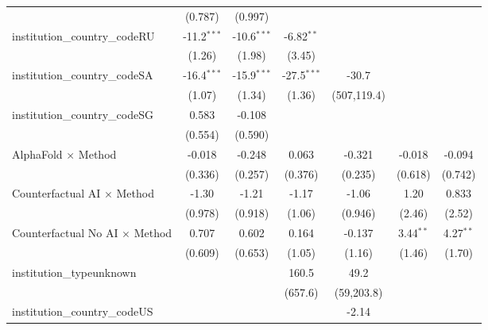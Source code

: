 \begin{tabular}{lcccccc}
                                         & (0.787)       & (0.997)       &               &              &               &   \\   
   institution\_country\_codeRU          & -11.2$^{***}$ & -10.6$^{***}$ & -6.82$^{**}$  &              &               &   \\   
                                         & (1.26)        & (1.98)        & (3.45)        &              &               &   \\   
   institution\_country\_codeSA          & -16.4$^{***}$ & -15.9$^{***}$ & -27.5$^{***}$ & -30.7        &               &   \\   
                                         & (1.07)        & (1.34)        & (1.36)        & (507,119.4)  &               &   \\   
   institution\_country\_codeSG          & 0.583         & -0.108        &               &              &               &   \\   
                                         & (0.554)       & (0.590)       &               &              &               &   \\   
   AlphaFold $\times$ Method             & -0.018        & -0.248        & 0.063         & -0.321       & -0.018        & -0.094\\   
                                         & (0.336)       & (0.257)       & (0.376)       & (0.235)      & (0.618)       & (0.742)\\   
   Counterfactual AI $\times$ Method     & -1.30         & -1.21         & -1.17         & -1.06        & 1.20          & 0.833\\   
                                         & (0.978)       & (0.918)       & (1.06)        & (0.946)      & (2.46)        & (2.52)\\   
   Counterfactual No AI $\times$ Method  & 0.707         & 0.602         & 0.164         & -0.137       & 3.44$^{**}$   & 4.27$^{**}$\\   
                                         & (0.609)       & (0.653)       & (1.05)        & (1.16)       & (1.46)        & (1.70)\\   
   institution\_typeunknown              &               &               & 160.5         & 49.2         &               &   \\   
                                         &               &               & (657.6)       & (59,203.8)   &               &   \\   
   institution\_country\_codeUS          &               &               &               & -2.14        &               &   \\   

\end{tabular}
